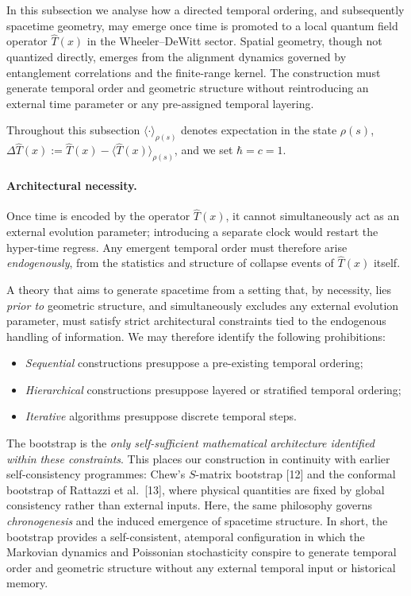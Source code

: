\documentclass[12pt,a4paper]{article}
\numberwithin{equation}{section}
\begin{document}
\vspace{0.3cm}
In this subsection we analyse how a directed temporal ordering, and subsequently spacetime geometry, may emerge once time is promoted to a local quantum field operator $\hat T(x)$ in the Wheeler--DeWitt sector. Spatial geometry, though not quantized directly, emerges from the alignment dynamics governed by entanglement correlations and the finite-range kernel. The construction must generate temporal order and geometric structure without reintroducing an external time parameter or any pre-assigned temporal layering.

\vspace{0.3cm}

\noindent Throughout this subsection $\langle\cdot\rangle_{\rho(s)}$ denotes expectation in the state $\rho(s)$, $\Delta\hat T(x):=\hat T(x)-\langle\hat T(x)\rangle_{\rho(s)}$, and we set $\hbar=c=1$.

\paragraph{Architectural necessity.}
Once time is encoded by the operator $\hat T(x)$, it cannot simultaneously act as an external evolution parameter; introducing a separate clock would restart the hyper-time regress. Any emergent temporal order must therefore arise \emph{endogenously}, from the statistics and structure of collapse events of $\hat T(x)$ itself. 

A theory that aims to generate spacetime from a setting that, by necessity, lies \emph{prior to} geometric structure, and simultaneously excludes any external evolution parameter, must satisfy strict architectural constraints tied to the endogenous handling of information. We may therefore identify the following prohibitions:
\begin{itemize}[leftmargin=1.5em,itemsep=0.1em]
\item \emph{Sequential} constructions presuppose a pre-existing temporal ordering;
\item \emph{Hierarchical} constructions presuppose layered or stratified temporal ordering;
\item \emph{Iterative} algorithms presuppose discrete temporal steps.
\end{itemize}
The bootstrap is the \emph{only self-sufficient mathematical architecture identified within these constraints}. This places our construction in continuity with earlier self-consistency programmes: Chew's $S$-matrix bootstrap [12] and the conformal bootstrap of Rattazzi et al.\ [13], where physical quantities are fixed by global consistency rather than external inputs. Here, the same philosophy governs \emph{chronogenesis} and the induced emergence of spacetime structure. In short, the bootstrap provides a self-consistent, atemporal configuration in which the Markovian dynamics and Poissonian stochasticity conspire to generate temporal order and geometric structure without any external temporal input or historical memory.
\end{document}
